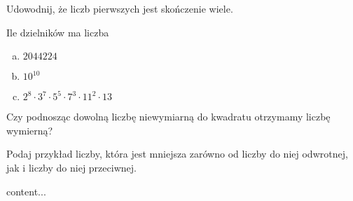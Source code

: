 \documentclass[12pt,a4paper]{article}
\theoremstyle{break}
\begin{document}
	\begin{zad}
		Udowodnij, że liczb pierwszych jest skończenie wiele.
	\end{zad}

	\begin{zad}
		Ile dzielników ma liczba
		\begin{enumerate}[a)]
			\item $2044224$
			\item $10^{10}$
			\item $2^8\cdot3^7\cdot5^5\cdot7^3\cdot11^2\cdot13$
		\end{enumerate}
	\end{zad}
	
	\begin{zad}
		Czy podnosząc dowolną liczbę niewymiarną do kwadratu otrzymamy liczbę wymierną?
	\end{zad}
	
	\begin{zad}
		Podaj przykład liczby, która jest mniejsza zarówno od liczby do niej odwrotnej, jak i liczby do niej przeciwnej.
	\end{zad}
	
	\begin{zad}
		content...
	\end{zad}
	
\end{document}
